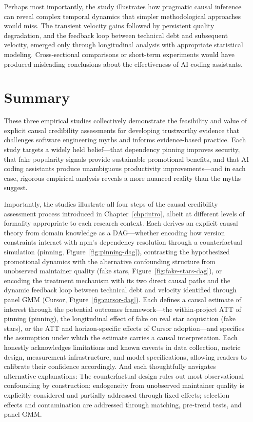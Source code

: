 Perhaps most importantly, the study illustrates how pragmatic causal inference can reveal complex temporal dynamics that simpler methodological approaches would miss.
The transient velocity gains followed by persistent quality degradation, and the feedback loop between technical debt and subsequent velocity, emerged only through longitudinal analysis with appropriate statistical modeling.
Cross-sectional comparisons or short-term experiments would have produced misleading conclusions about the effectiveness of AI coding assistants.

\section{Summary}

These three empirical studies collectively demonstrate the feasibility and value of explicit causal credibility assessments for developing trustworthy evidence that challenges software engineering myths and informs evidence-based practice.
Each study targets a widely held belief---that dependency pinning improves security, that fake popularity signals provide sustainable promotional benefits, and that AI coding assistants produce unambiguous productivity improvements---and in each case, rigorous empirical analysis reveals a more nuanced reality than the myths suggest.

Importantly, the studies illustrate all four steps of the causal credibility assessment process introduced in Chapter~\ref{chp:intro}, albeit at different levels of formality appropriate to each research context.
Each derives an explicit causal theory from domain knowledge as a DAG---whether encoding how version constraints interact with npm's dependency resolution through a counterfactual simulation (pinning, Figure~\ref{fig:pinning-dag}), contrasting the hypothesized promotional dynamics with the alternative confounding structure from unobserved maintainer quality (fake stars, Figure~\ref{fig:fake-stars-dag}), or encoding the treatment mechanism with its two direct causal paths and the dynamic feedback loop between technical debt and velocity identified through panel GMM (Cursor, Figure~\ref{fig:cursor-dag}).
Each defines a causal estimate of interest through the potential outcomes framework---the within-project ATT of pinning (pinning), the longitudinal effect of fake on real star acquisition (fake stars), or the ATT and horizon-specific effects of Cursor adoption---and specifies the assumption under which the estimate carries a causal interpretation.
Each honestly acknowledges limitations and known caveats in data collection, metric design, measurement infrastructure, and model specifications, allowing readers to calibrate their confidence accordingly.
And each thoughtfully navigates alternative explanations: The counterfactual design rules out most observational confounding by construction; endogeneity from unobserved maintainer quality is explicitly considered and partially addressed through fixed effects; selection effects and contamination are addressed through matching, pre-trend tests, and panel GMM.

